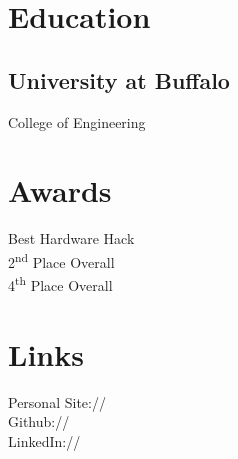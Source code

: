 \documentclass[]{deedy-resume-openfont}
\begin{document}
%
%
\lastupdated

%
%



%
%

\begin{minipage}[t]{0.33\textwidth}


\section{Education}

\subsection{University at Buffalo}

College of Engineering \\
\sectionsep


\section{Awards}
Best Hardware Hack\\
2\textsuperscript{nd} Place Overall\\
4\textsuperscript{th} Place Overall\\
\sectionsep


\section{Links}
Personal Site:// \href{https://aanelli.github.io}{} \\
Github:// \href{https://github.com/xanderrman}{} \\
LinkedIn://  \href{https://www.linkedin.com/in/alex-anelli}{} \\
\sectionsep


\end{minipage}
\end{document}
